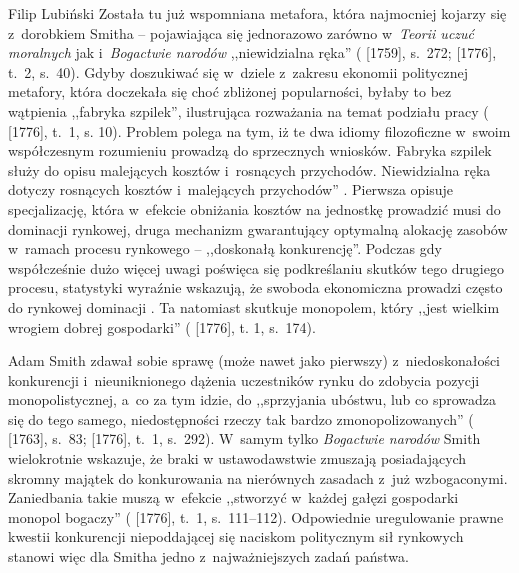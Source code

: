 \begin{artplenv}{Filip Lubiński}
Została tu już wspomniana metafora, która najmocniej kojarzy się z~dorobkiem Smitha -- pojawiająca się jednorazowo
zarówno w~\textit{Teorii uczuć moralnych} jak i~\textit{Bogactwie narodów} ,,niewidzialna ręka''
(\cite{smith_teoria_1989} [1759], s.~272; \cite*{smith_badania_2007} [1776], t.~2, s.~40).
Gdyby doszukiwać
się w~dziele z~zakresu ekonomii politycznej metafory, która doczekała się choć zbliżonej popularności,
byłaby to bez wątpienia
,,fabryka szpilek'', ilustrująca rozważania na temat podziału pracy
(\cite{smith_badania_2007} [1776], t.~1, s. 10).
Problem polega na tym, iż te dwa idiomy filozoficzne w~swoim współczesnym rozumieniu prowadzą do sprzecznych
wniosków. Fabryka szpilek służy do opisu malejących kosztów i~rosnących przychodów. Niewidzialna ręka dotyczy rosnących
kosztów i~malejących przychodów''
\parencite[s.~47]{warsh_wiedza_2012}.
Pierwsza opisuje specjalizację,
która w~efekcie obniżania kosztów na jednostkę prowadzić musi do dominacji rynkowej, druga mechanizm gwarantujący optymalną
alokację zasobów w~ramach procesu rynkowego -- ,,doskonałą konkurencję''. Podczas gdy współcześnie dużo więcej uwagi
poświęca się podkreślaniu skutków tego drugiego procesu, statystyki wyraźnie wskazują, że swoboda ekonomiczna prowadzi
często do rynkowej dominacji
\parencite[s.~125–126]{keen_debunking_2011}.
Ta natomiast skutkuje monopolem, który
,,jest wielkim wrogiem dobrej gospodarki''
(\cite{smith_badania_2007} [1776], t. 1, s.~174).

 Adam Smith zdawał sobie sprawę (może nawet jako pierwszy) z~niedoskonałości konkurencji i~nieuniknionego dążenia
uczestników rynku do zdobycia pozycji monopolistycznej, a~co za tym idzie, do ,,sprzyjania ubóstwu, lub co sprowadza się
do tego samego, niedostępności rzeczy tak bardzo zmonopolizowanych''
(\cite{smith_lectures_1982} [1763], s.~83; \cite*{smith_badania_2007} [1776], t.~1, s.~292).
W~samym tylko \textit{Bogactwie narodów} Smith wielokrotnie wskazuje, że braki w
ustawodawstwie zmuszają posiadających skromny majątek do konkurowania na nierównych zasadach z~już wzbogaconymi.
Zaniedbania takie muszą w~efekcie ,,stworzyć w~każdej gałęzi gospodarki monopol bogaczy''
(\cite{smith_badania_2007} [1776], t.~1, s.~111--112).
Odpowiednie uregulowanie prawne kwestii konkurencji
niepoddającej się naciskom politycznym sił rynkowych stanowi więc dla Smitha jedno z~najważniejszych zadań państwa.


\end{artplenv}
